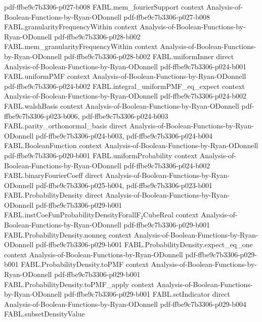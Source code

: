 \begin{theorem}
  {pdf-ffbe9c7b3306-p027-b008}
\proofstep
  {FABL.mem_fourierSupport}
  {context}
  {Analysis-of-Boolean-Functions-by-Ryan-ODonnell}
  {pdf-ffbe9c7b3306-p027-b008}
\proofstep
  {FABL.granularityFrequencyWithin}
  {context}
  {Analysis-of-Boolean-Functions-by-Ryan-ODonnell}
  {pdf-ffbe9c7b3306-p028-b002}
\proofstep
  {FABL.mem_granularityFrequencyWithin}
  {context}
  {Analysis-of-Boolean-Functions-by-Ryan-ODonnell}
  {pdf-ffbe9c7b3306-p028-b002}
\proofstep
  {FABL.uniformInner}
  {direct}
  {Analysis-of-Boolean-Functions-by-Ryan-ODonnell}
  {pdf-ffbe9c7b3306-p024-b001}
\proofstep
  {FABL.uniformPMF}
  {context}
  {Analysis-of-Boolean-Functions-by-Ryan-ODonnell}
  {pdf-ffbe9c7b3306-p024-b002}
\proofstep
  {FABL.integral_uniformPMF_eq_expect}
  {context}
  {Analysis-of-Boolean-Functions-by-Ryan-ODonnell}
  {pdf-ffbe9c7b3306-p024-b002}
\proofstep
  {FABL.walshBasis}
  {context}
  {Analysis-of-Boolean-Functions-by-Ryan-ODonnell}
  {pdf-ffbe9c7b3306-p023-b006,
    pdf-ffbe9c7b3306-p024-b003}
\proofstep
  {FABL.parity_orthonormal_basis}
  {direct}
  {Analysis-of-Boolean-Functions-by-Ryan-ODonnell}
  {pdf-ffbe9c7b3306-p024-b003,
    pdf-ffbe9c7b3306-p024-b004}
\proofstep
  {FABL.BooleanFunction}
  {context}
  {Analysis-of-Boolean-Functions-by-Ryan-ODonnell}
  {pdf-ffbe9c7b3306-p020-b001}
\proofstep
  {FABL.uniformProbability}
  {context}
  {Analysis-of-Boolean-Functions-by-Ryan-ODonnell}
  {pdf-ffbe9c7b3306-p024-b002}
\proofstep
  {FABL.binaryFourierCoeff}
  {direct}
  {Analysis-of-Boolean-Functions-by-Ryan-ODonnell}
  {pdf-ffbe9c7b3306-p025-b004,
    pdf-ffbe9c7b3306-p023-b001}
\proofstep
  {FABL.ProbabilityDensity}
  {direct}
  {Analysis-of-Boolean-Functions-by-Ryan-ODonnell}
  {pdf-ffbe9c7b3306-p029-b001}
\proofstep
  {FABL.instCoeFunProbabilityDensityForallF₂CubeReal}
  {context}
  {Analysis-of-Boolean-Functions-by-Ryan-ODonnell}
  {pdf-ffbe9c7b3306-p029-b001}
\proofstep
  {FABL.ProbabilityDensity.nonneg}
  {context}
  {Analysis-of-Boolean-Functions-by-Ryan-ODonnell}
  {pdf-ffbe9c7b3306-p029-b001}
\proofstep
  {FABL.ProbabilityDensity.expect_eq_one}
  {context}
  {Analysis-of-Boolean-Functions-by-Ryan-ODonnell}
  {pdf-ffbe9c7b3306-p029-b001}
\proofstep
  {FABL.ProbabilityDensity.toPMF}
  {context}
  {Analysis-of-Boolean-Functions-by-Ryan-ODonnell}
  {pdf-ffbe9c7b3306-p029-b001}
\proofstep
  {FABL.ProbabilityDensity.toPMF_apply}
  {context}
  {Analysis-of-Boolean-Functions-by-Ryan-ODonnell}
  {pdf-ffbe9c7b3306-p029-b001}
\proofstep
  {FABL.setIndicator}
  {direct}
  {Analysis-of-Boolean-Functions-by-Ryan-ODonnell}
  {pdf-ffbe9c7b3306-p029-b004}
\proofstep
  {FABL.subsetDensityValue}

\end{theorem}
